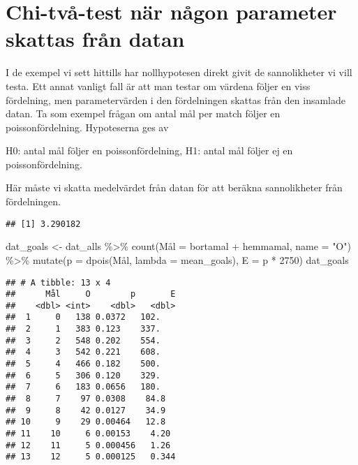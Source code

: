 \documentclass[
]{book}
\newenvironment{Shaded}{\begin{snugshade}}{\end{snugshade}}
\newcommand{\AttributeTok}[1]{\textcolor[rgb]{0.77,0.63,0.00}{#1}}
\newcommand{\DecValTok}[1]{\textcolor[rgb]{0.00,0.00,0.81}{#1}}
\newcommand{\FunctionTok}[1]{\textcolor[rgb]{0.00,0.00,0.00}{#1}}
\newcommand{\NormalTok}[1]{#1}
\newcommand{\OtherTok}[1]{\textcolor[rgb]{0.56,0.35,0.01}{#1}}
\newcommand{\SpecialCharTok}[1]{\textcolor[rgb]{0.00,0.00,0.00}{#1}}
\newcommand{\StringTok}[1]{\textcolor[rgb]{0.31,0.60,0.02}{#1}}
\theoremstyle{definition}
\theoremstyle{definition}
\theoremstyle{definition}
\theoremstyle{definition}
\theoremstyle{remark}
\begin{document}
\hypertarget{chi-tvuxe5-test-nuxe4r-nuxe5gon-parameter-skattas-fruxe5n-datan}{%
\section{Chi-två-test när någon parameter skattas från datan}\label{chi-tvuxe5-test-nuxe4r-nuxe5gon-parameter-skattas-fruxe5n-datan}}

I de exempel vi sett hittills har nollhypotesen direkt givit de sannolikheter vi vill testa. Ett annat vanligt fall är att man testar om värdena följer en viss fördelning, men parametervärden i den fördelningen skattas från den insamlade datan. Ta som exempel frågan om antal mål per match följer en poissonfördelning. Hypoteserna ges av

H0: antal mål följer en poissonfördelning,
H1: antal mål följer ej en poissonfördelning.

Här måste vi skatta medelvärdet från datan för att beräkna sannolikheter från fördelningen.

\begin{Shaded}
\end{Shaded}

\begin{verbatim}
## [1] 3.290182
\end{verbatim}

\begin{Shaded}
\begin{Highlighting}[]
\NormalTok{dat\_goals }\OtherTok{\textless{}{-}}\NormalTok{ dat\_alls }\SpecialCharTok{\%\textgreater{}\%} 
  \FunctionTok{count}\NormalTok{(Mål }\OtherTok{=}\NormalTok{ bortamal }\SpecialCharTok{+}\NormalTok{ hemmamal, }\AttributeTok{name =} \StringTok{"O"}\NormalTok{) }\SpecialCharTok{\%\textgreater{}\%} 
  \FunctionTok{mutate}\NormalTok{(}\AttributeTok{p =} \FunctionTok{dpois}\NormalTok{(Mål, }\AttributeTok{lambda =}\NormalTok{ mean\_goals),}
         \AttributeTok{E =}\NormalTok{ p }\SpecialCharTok{*} \DecValTok{2750}\NormalTok{)}
\NormalTok{dat\_goals}
\end{Highlighting}
\end{Shaded}

\begin{verbatim}
## # A tibble: 13 x 4
##      Mål     O        p       E
##    <dbl> <int>    <dbl>   <dbl>
##  1     0   138 0.0372   102.   
##  2     1   383 0.123    337.   
##  3     2   548 0.202    554.   
##  4     3   542 0.221    608.   
##  5     4   466 0.182    500.   
##  6     5   306 0.120    329.   
##  7     6   183 0.0656   180.   
##  8     7    97 0.0308    84.8  
##  9     8    42 0.0127    34.9  
## 10     9    29 0.00464   12.8  
## 11    10     6 0.00153    4.20 
## 12    11     5 0.000456   1.26 
## 13    12     5 0.000125   0.344
\end{verbatim}
\end{document}
